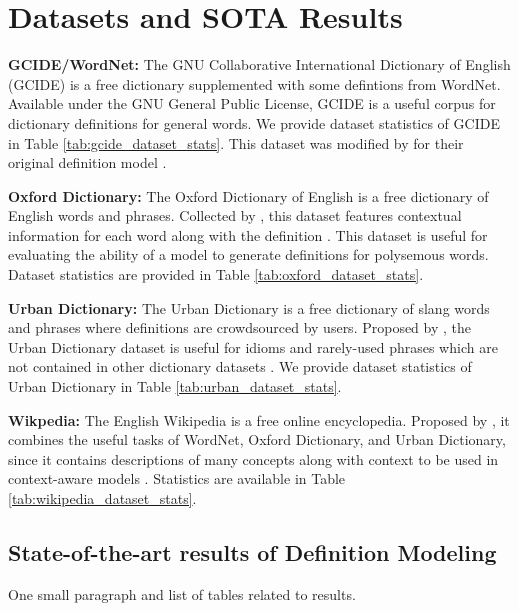 \section{Datasets and SOTA Results}

\textbf{GCIDE/WordNet:} The GNU Collaborative International Dictionary of
English (GCIDE) is a free dictionary supplemented with some defintions from
WordNet. Available under the GNU General Public License, GCIDE is a useful
corpus for dictionary definitions for general words. We provide dataset
statistics of GCIDE in Table \ref{tab:gcide_dataset_stats}. This dataset was
modified by \citeauthor*{noraset_definition_2016} for their original definition model
\cite{noraset_definition_2016}.

\textbf{Oxford Dictionary:} The Oxford Dictionary of English is a free
dictionary of English words and phrases. Collected by \citeauthor*{gadetsky_conditional_2018},
this dataset features contextual information for each word along with the
definition \cite{gadetsky_conditional_2018}. This dataset is useful for evaluating the ability of a model to
generate definitions for polysemous words. Dataset statistics are provided in
Table \ref{tab:oxford_dataset_stats}.

\textbf{Urban Dictionary:} The Urban Dictionary is a free dictionary of slang
words and phrases where definitions are crowdsourced by users. Proposed by
\citeauthor*{ni_learning_2017}, the Urban Dictionary dataset is useful for idioms and
rarely-used phrases which are not contained in other dictionary datasets
\cite{ni_learning_2017}. We provide dataset statistics of Urban Dictionary in Table
\ref{tab:urban_dataset_stats}.

\textbf{Wikpedia:} The English Wikipedia is a free online encyclopedia. Proposed
by \citeauthor*{ishiwatari_learning_2019}, it combines the useful tasks of WordNet, Oxford
Dictionary, and Urban Dictionary, since it contains descriptions of many
concepts along with context to be used in context-aware models \cite{ishiwatari_learning_2019}. Statistics are
available in Table \ref{tab:wikipedia_dataset_stats}.


\subsection{State-of-the-art results of Definition Modeling}
One small paragraph and list of tables related to results.
